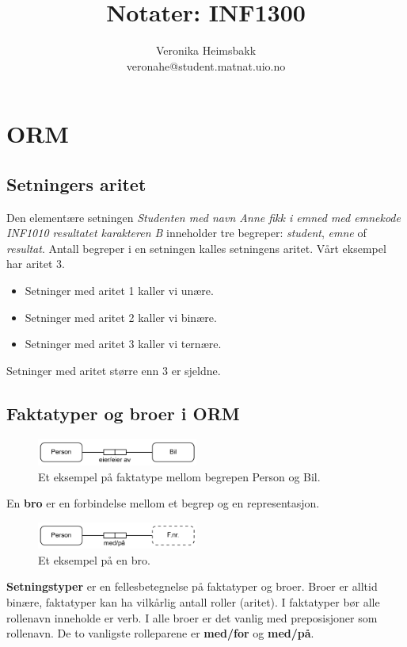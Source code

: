 \documentclass[11pt,a4paper]{article}
\title{Notater: INF1300}
\author{Veronika Heimsbakk \\ 
veronahe@student.matnat.uio.no}
\begin{document}
\maketitle{}
\tableofcontents
\newpage{}

\section{ORM}
\subsection{Setningers aritet}
Den elementære setningen \textit{Studenten med navn Anne fikk i emned med emnekode INF1010 resultatet karakteren B} inneholder tre begreper: \textit{student}, \textit{emne} of \textit{resultat}. Antall begreper i en setningen kalles setningens aritet. Vårt eksempel har aritet 3. 

\begin{itemize}
\item{Setninger med aritet 1 kaller vi unære.}
\item{Setninger med aritet 2 kaller vi binære.}
\item{Setninger med aritet 3 kaller vi ternære.}
\end{itemize}

Setninger med aritet større enn 3 er sjeldne.

\subsection{Faktatyper og broer i ORM}
\begin{figure}[h!]
	\centering
		\includegraphics[width=200px]{img/fakta-01.png}
	\caption{Et eksempel på faktatype mellom begrepen Person og Bil.}
\end{figure}

En \textbf{bro} er en forbindelse mellom et begrep og en representasjon.
\begin{figure}[h!]
	\centering
		\includegraphics[width=200px]{img/bro-01.png}
	\caption{Et eksempel på en bro.}
\end{figure}

\textbf{Setningstyper} er en fellesbetegnelse på faktatyper og broer. Broer er alltid binære, faktatyper kan ha vilkårlig antall roller (aritet).
I faktatyper bør alle rollenavn inneholde er verb. I alle broer er det vanlig med preposisjoner som rollenavn. De to vanligste rolleparene er \textbf{med/for} og \textbf{med/på}.
\end{document}

